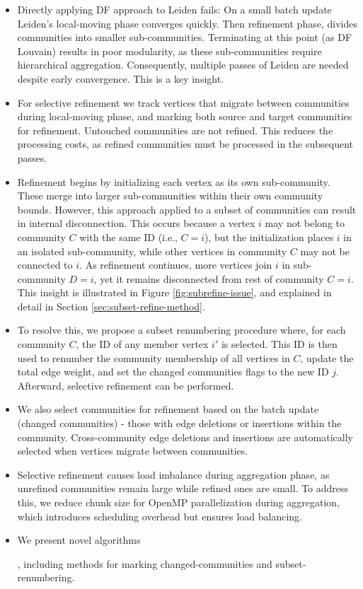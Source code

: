 \begin{itemize}
  \item Directly applying DF approach \cite{sahu2024shared} to Leiden fails: On a small batch update Leiden's local-moving phase converges quickly. Then refinement phase, divides communities into smaller sub-communities. Terminating at this point (as DF Louvain) results in poor modularity, as these sub-communities require hierarchical aggregation. Consequently, multiple passes of Leiden are needed despite early convergence. This is a key insight.
  \item For selective refinement we track vertices that migrate between communities during local-moving phase, and marking both source and target communities for refinement. Untouched communities are not refined. This reduces the processing costs, as refined communities must be processed in the subsequent passes.
  \item Refinement begins by initializing each vertex as its own sub-community. These merge into larger sub-communities within their own community bounds. However, this approach applied to a subset of communities can result in internal disconnection. This occurs because a vertex $i$ may not belong to community $C$ with the same ID (i.e., $C = i$), but the initialization places $i$ in an isolated sub-community, while other vertices in community $C$ may not be connected to $i$. As refinement continues, more vertices join $i$ in sub-community $D = i$, yet it remains disconnected from rest of community $C = i$. This insight is illustrated in Figure \ref{fig:subrefine-issue}, and explained in detail in Section \ref{sec:subset-refine-method}.
  \item To resolve this, we propose a subset renumbering procedure where, for each community $C$, the ID of any member vertex $i'$ is selected. This ID is then used to renumber the community membership of all vertices in $C$, update the total edge weight, and set the changed communities flags to the new ID $j$. Afterward, selective refinement can be performed.
  \item We also select communities for refinement based on the batch update (changed communities) - those with edge deletions or insertions within the community. Cross-community edge deletions and insertions are automatically selected when vertices migrate between communities.
  \item Selective refinement causes load imbalance during aggregation phase, as unrefined communities remain large while refined ones are small. To address this, we reduce chunk size for OpenMP parallelization during aggregation, which introduces scheduling overhead but ensures load balancing.
  \item We present novel algorithms, including methods for marking changed-communities and subset-renumbering.
\end{itemize}


